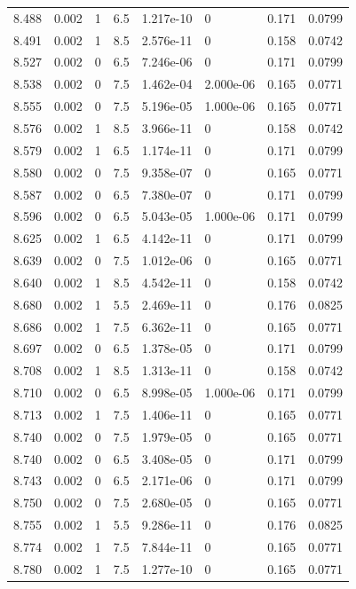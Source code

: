 \documentclass[preview]{standalone}
\begin{document}
{{{{{{{{{\begin{tabular}{L{1.2cm}C{1.2cm} C{0.3cm}C{0.5cm} C{1.4cm}C{1.4cm} C{1.4cm}C{1.4cm}}
  8.488  &  0.002  & 1     & 6.5 &  1.217e-10  & 0  & 0.171 &  0.0799   \\ 
  8.491  &  0.002  & 1     & 8.5 &  2.576e-11  & 0  & 0.158 &  0.0742   \\ 
  8.527  &  0.002  & 0     & 6.5 &  7.246e-06  & 0  & 0.171 &  0.0799   \\ 
  8.538  &  0.002  & 0     & 7.5 &  1.462e-04  & 2.000e-06  & 0.165 &  0.0771   \\ 
  8.555  &  0.002  & 0     & 7.5 &  5.196e-05  & 1.000e-06  & 0.165 &  0.0771   \\ 
  8.576  &  0.002  & 1     & 8.5 &  3.966e-11  & 0  & 0.158 &  0.0742   \\ 
  8.579  &  0.002  & 1     & 6.5 &  1.174e-11  & 0  & 0.171 &  0.0799   \\ 
  8.580  &  0.002  & 0     & 7.5 &  9.358e-07  & 0  & 0.165 &  0.0771   \\ 
  8.587  &  0.002  & 0     & 6.5 &  7.380e-07  & 0  & 0.171 &  0.0799   \\ 
  8.596  &  0.002  & 0     & 6.5 &  5.043e-05  & 1.000e-06  & 0.171 &  0.0799   \\ 
  8.625  &  0.002  & 1     & 6.5 &  4.142e-11  & 0  & 0.171 &  0.0799   \\ 
  8.639  &  0.002  & 0     & 7.5 &  1.012e-06  & 0  & 0.165 &  0.0771   \\ 
  8.640  &  0.002  & 1     & 8.5 &  4.542e-11  & 0  & 0.158 &  0.0742   \\ 
  8.680  &  0.002  & 1     & 5.5 &  2.469e-11  & 0  & 0.176 &  0.0825   \\ 
  8.686  &  0.002  & 1     & 7.5 &  6.362e-11  & 0  & 0.165 &  0.0771   \\ 
  8.697  &  0.002  & 0     & 6.5 &  1.378e-05  & 0  & 0.171 &  0.0799   \\ 
  8.708  &  0.002  & 1     & 8.5 &  1.313e-11  & 0  & 0.158 &  0.0742   \\ 
  8.710  &  0.002  & 0     & 6.5 &  8.998e-05  & 1.000e-06  & 0.171 &  0.0799   \\ 
  8.713  &  0.002  & 1     & 7.5 &  1.406e-11  & 0  & 0.165 &  0.0771   \\ 
  8.740  &  0.002  & 0     & 7.5 &  1.979e-05  & 0  & 0.165 &  0.0771   \\ 
  8.740  &  0.002  & 0     & 6.5 &  3.408e-05  & 0  & 0.171 &  0.0799   \\ 
  8.743  &  0.002  & 0     & 6.5 &  2.171e-06  & 0  & 0.171 &  0.0799   \\ 
  8.750  &  0.002  & 0     & 7.5 &  2.680e-05  & 0  & 0.165 &  0.0771   \\ 
  8.755  &  0.002  & 1     & 5.5 &  9.286e-11  & 0  & 0.176 &  0.0825   \\ 
  8.774  &  0.002  & 1     & 7.5 &  7.844e-11  & 0  & 0.165 &  0.0771   \\ 
  8.780  &  0.002  & 1     & 7.5 &  1.277e-10  & 0  & 0.165 &  0.0771   \\ 
\hline 
\end{tabular} 

}}}}}}}}}
\end{document}
